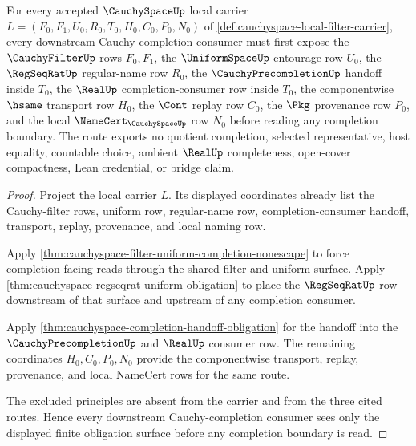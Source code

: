 \begin{theorem}
\label{thm:cauchyspace-obligation-coverage-route}
For every accepted $\CauchySpaceUp$ local carrier $L=(F_0,F_1,U_0,R_0,T_0,H_0,C_0,P_0,N_0)$ of \autoref{def:cauchyspace-local-filter-carrier}, every downstream Cauchy-completion consumer must first expose the $\CauchyFilterUp$ rows $F_0,F_1$, the $\UniformSpaceUp$ entourage row $U_0$, the $\RegSeqRatUp$ regular-name row $R_0$, the $\CauchyPrecompletionUp$ handoff inside $T_0$, the $\RealUp$ completion-consumer row inside $T_0$, the componentwise $\hsame$ transport row $H_0$, the $\Cont$ replay row $C_0$, the $\Pkg$ provenance row $P_0$, and the local $\NameCert_{\CauchySpaceUp}$ row $N_0$ before reading any completion boundary. The route exports no quotient completion, selected representative, host equality, countable choice, ambient $\RealUp$ completeness, open-cover compactness, Lean credential, or bridge claim.
\end{theorem}
\begin{proof}
Project the local carrier $L$. Its displayed coordinates already list the Cauchy-filter rows, uniform row, regular-name row, completion-consumer handoff, transport, replay, provenance, and local naming row.

Apply \autoref{thm:cauchyspace-filter-uniform-completion-nonescape} to force completion-facing reads through the shared filter and uniform surface. Apply \autoref{thm:cauchyspace-regseqrat-uniform-obligation} to place the $\RegSeqRatUp$ row downstream of that surface and upstream of any completion consumer.

Apply \autoref{thm:cauchyspace-completion-handoff-obligation} for the handoff into the $\CauchyPrecompletionUp$ and $\RealUp$ consumer row. The remaining coordinates $H_0,C_0,P_0,N_0$ provide the componentwise transport, replay, provenance, and local NameCert rows for the same route.

The excluded principles are absent from the carrier and from the three cited routes. Hence every downstream Cauchy-completion consumer sees only the displayed finite obligation surface before any completion boundary is read.
\end{proof}

